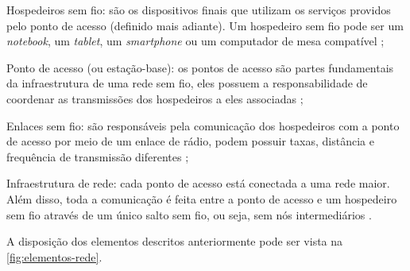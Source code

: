 \begin{compactitem}
	\item Hospedeiros sem fio: são os dispositivos finais que utilizam os serviços providos pelo ponto de acesso (definido mais adiante). Um hospedeiro sem fio pode ser um \textit{notebook}, um \textit{tablet}, um \textit{smartphone} ou um computador de mesa compatível \cite{kurose2013};
	\item Ponto de acesso (ou estação-base): os pontos de acesso são partes fundamentais da infraestrutura de uma rede sem fio, eles possuem a responsabilidade de coordenar as transmissões dos hospedeiros a eles associadas \cite{kurose2013};
	\item Enlaces sem fio: são responsáveis pela comunicação dos hospedeiros com a ponto de acesso por meio de um enlace de rádio, podem possuir taxas, distância e frequência de transmissão diferentes \cite{kurose2013};
	\item Infraestrutura de rede: cada ponto de acesso está conectada a uma rede maior. Além disso, toda a comunicação é feita entre a ponto de acesso e um hospedeiro sem fio através de um único salto sem fio, ou seja, sem nós intermediários \cite{kurose2013}.
\end{compactitem}

A disposição dos elementos descritos anteriormente pode ser vista na \autoref{fig:elementos-rede}.

\begin{figure}[H]
	\centering
\end{figure}

